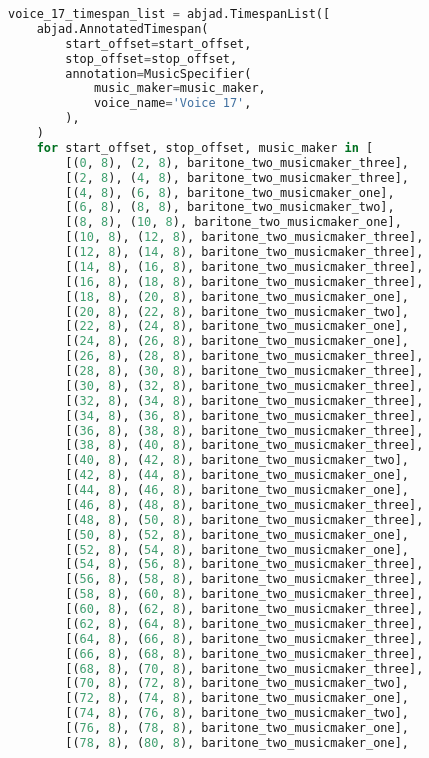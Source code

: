 \begin{lstlisting}[language=Python, caption=Invocation Source Code]
voice_17_timespan_list = abjad.TimespanList([
    abjad.AnnotatedTimespan(
        start_offset=start_offset,
        stop_offset=stop_offset,
        annotation=MusicSpecifier(
            music_maker=music_maker,
            voice_name='Voice 17',
        ),
    )
    for start_offset, stop_offset, music_maker in [
        [(0, 8), (2, 8), baritone_two_musicmaker_three],
        [(2, 8), (4, 8), baritone_two_musicmaker_three],
        [(4, 8), (6, 8), baritone_two_musicmaker_one],
        [(6, 8), (8, 8), baritone_two_musicmaker_two],
        [(8, 8), (10, 8), baritone_two_musicmaker_one],
        [(10, 8), (12, 8), baritone_two_musicmaker_three],
        [(12, 8), (14, 8), baritone_two_musicmaker_three],
        [(14, 8), (16, 8), baritone_two_musicmaker_three],
        [(16, 8), (18, 8), baritone_two_musicmaker_three],
        [(18, 8), (20, 8), baritone_two_musicmaker_one],
        [(20, 8), (22, 8), baritone_two_musicmaker_two],
        [(22, 8), (24, 8), baritone_two_musicmaker_one],
        [(24, 8), (26, 8), baritone_two_musicmaker_one],
        [(26, 8), (28, 8), baritone_two_musicmaker_three],
        [(28, 8), (30, 8), baritone_two_musicmaker_three],
        [(30, 8), (32, 8), baritone_two_musicmaker_three],
        [(32, 8), (34, 8), baritone_two_musicmaker_three],
        [(34, 8), (36, 8), baritone_two_musicmaker_three],
        [(36, 8), (38, 8), baritone_two_musicmaker_three],
        [(38, 8), (40, 8), baritone_two_musicmaker_three],
        [(40, 8), (42, 8), baritone_two_musicmaker_two],
        [(42, 8), (44, 8), baritone_two_musicmaker_one],
        [(44, 8), (46, 8), baritone_two_musicmaker_one],
        [(46, 8), (48, 8), baritone_two_musicmaker_three],
        [(48, 8), (50, 8), baritone_two_musicmaker_three],
        [(50, 8), (52, 8), baritone_two_musicmaker_one],
        [(52, 8), (54, 8), baritone_two_musicmaker_one],
        [(54, 8), (56, 8), baritone_two_musicmaker_three],
        [(56, 8), (58, 8), baritone_two_musicmaker_three],
        [(58, 8), (60, 8), baritone_two_musicmaker_three],
        [(60, 8), (62, 8), baritone_two_musicmaker_three],
        [(62, 8), (64, 8), baritone_two_musicmaker_three],
        [(64, 8), (66, 8), baritone_two_musicmaker_three],
        [(66, 8), (68, 8), baritone_two_musicmaker_three],
        [(68, 8), (70, 8), baritone_two_musicmaker_three],
        [(70, 8), (72, 8), baritone_two_musicmaker_two],
        [(72, 8), (74, 8), baritone_two_musicmaker_one],
        [(74, 8), (76, 8), baritone_two_musicmaker_two],
        [(76, 8), (78, 8), baritone_two_musicmaker_one],
        [(78, 8), (80, 8), baritone_two_musicmaker_one],

\end{lstlisting}
